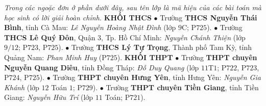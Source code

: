 \begin{multicols}{2}
	\textit{Trong các ngoặc đơn ở phần dưới đây, sau tên lớp là mã hiệu của các bài toán mà học sinh có lời giải hoàn chỉnh.}
	\vskip 0.05cm
	\textbf{\color{thachthuctoanhoc}KHỐI THCS}
	\vskip 0.05cm
	$\bullet$ Trường \textbf{\color{thachthuctoanhoc}THCS Nguyễn Thái Bình}, tỉnh Cà Mau: \textit{Lê Nguyễn Hoàng Nhật Đình} (lớp $9$C; P$725$).
	\vskip 0.05cm
	$\bullet$ Trường \textbf{\color{thachthuctoanhoc}THCS Lê Quý Đôn}, Quận $3$, Tp. Hồ Chí Minh: \textit{Nguyễn Chánh Thiện} (lớp $9/12$; P$723$, P$725$).
	\vskip 0.05cm
	$\bullet$ Trường \textbf{\color{thachthuctoanhoc}THCS Lý Tự Trọng}, Thành phố Tam Kỳ, tỉnh Quảng Nam: \textit{Phan Minh Huy} (P$725$).
	\vskip 0.05cm
	\textbf{\color{thachthuctoanhoc}KHỐI THPT}
	\vskip 0.05cm
	$\bullet$ Trường \textbf{\color{thachthuctoanhoc}THPT chuyên Nguyễn Quang Diêu}, tỉnh Đồng Tháp: \textit{Đỗ Duy Quang} (lớp $11$T$1$; P$722$, P$723$, P$724$, P$725$).
	\vskip 0.05cm
	$\bullet$ Trường \textbf{\color{thachthuctoanhoc}THPT chuyên Hưng Yên}, tỉnh Hưng Yên: \textit{Nguyễn Gia Khánh} (lớp $12$ Toán $1$; P$729$).
	\vskip 0.05cm
	$\bullet$ Trường \textbf{\color{thachthuctoanhoc}THPT chuyên Tiền Giang}, tỉnh Tiền Giang: \textit{Nguyễn Hữu Trí} (lớp $11$ Toán; P$721$).
\end{multicols}
